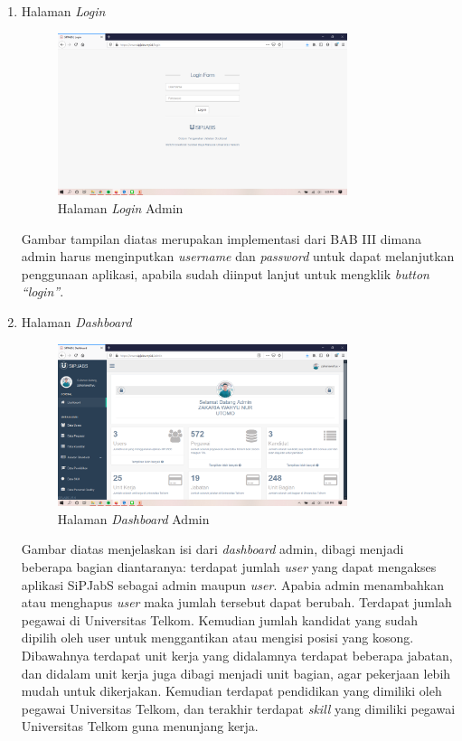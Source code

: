 \begin{enumerate}
	
	\item Halaman \textit{Login}
	\begin{figure}
		\centering
		\includegraphics[width=0.8\textwidth]
		{pics/admin/implementasi/login.png}
		\caption{Halaman \textit{Login} Admin}
		\label{fig:CC10}
	\end{figure}

	Gambar tampilan diatas merupakan implementasi dari BAB III dimana admin harus menginputkan \textit{username} dan \textit{password} untuk dapat melanjutkan penggunaan aplikasi, apabila sudah diinput lanjut untuk mengklik \textit{button “login”}. 
	
	\newpage
	\item Halaman \textit{Dashboard}
	\begin{figure}
		\centering
		\includegraphics[width=0.8\textwidth]
		{pics/admin/implementasi/dashboard.png}
		\caption{Halaman \textit{Dashboard} Admin}
		\label{fig:CC10}
	\end{figure}
	Gambar diatas menjelaskan isi dari \textit{dashboard} admin, dibagi menjadi beberapa bagian diantaranya: terdapat jumlah \textit{user} yang dapat mengakses aplikasi SiPJabS sebagai admin maupun \textit{user}. Apabia admin menambahkan atau menghapus \textit{user} maka jumlah tersebut dapat berubah. Terdapat jumlah pegawai di Universitas Telkom. Kemudian jumlah kandidat yang sudah dipilih oleh user untuk menggantikan atau mengisi posisi yang kosong. Dibawahnya terdapat unit kerja yang didalamnya terdapat beberapa jabatan, dan didalam unit kerja juga dibagi menjadi unit bagian, agar pekerjaan lebih mudah untuk dikerjakan. Kemudian terdapat pendidikan yang dimiliki oleh pegawai Universitas Telkom, dan terakhir terdapat \textit{skill} yang dimiliki pegawai Universitas Telkom guna menunjang kerja.
	

\end{enumerate}
